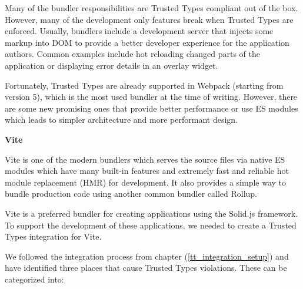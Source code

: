 Many of the bundler responsibilities are Trusted Types compliant out of the box. However, many of
the development only features break when Trusted Types are enforced. Usually, bundlers include a
development server that injects some markup into DOM to provide a better developer experience for
the application authors. Common examples include hot reloading changed parts of the application or
displaying error details in an overlay widget.

Fortunately, Trusted Types are already supported in Webpack (starting from version 5), which is the
most used bundler at the time of writing. However, there are some new promising ones that provide
better performance or use ES modules which leads to simpler architecture and more performant design.

\medskip
\begin{flushleft}\textbf {Vite}\end{flushleft}
\medskip

Vite is one of the modern bundlers which serves the source files via native ES modules which have
many built-in features and extremely fast and reliable hot module replacement (HMR) for development.
It also provides a simple way to bundle production code using another common bundler called Rollup.

Vite is a preferred bundler for creating applications using the Solid.js framework. To support the
development of these applications, we needed to create a Trusted Types integration for Vite.

We followed the integration process from chapter (\ref{tt_integration_setup}) and have
identified three places that cause Trusted Types violations. These can be categorized into:

